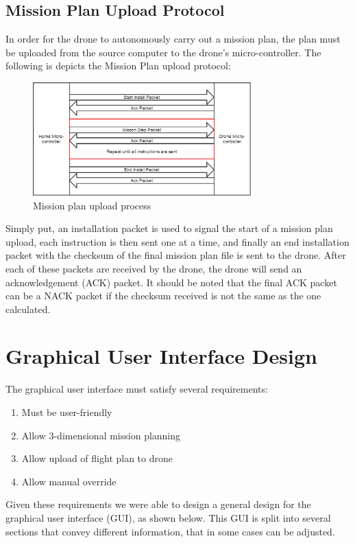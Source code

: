 \documentclass[12pt,a4paper]{article}
\begin{document}
	\subsection{Mission Plan Upload Protocol}
	In order for the drone to autonomously carry out a mission plan, the plan must be uploaded from the source computer to the drone's micro-controller. The following is depicts the Mission Plan upload protocol:
	

	\begin{figure}[h!]

  		\centering
    	\includegraphics[width=0.75\textwidth]{InstallProcessIdea1.png}
   		\caption{Mission plan upload process}
	\end{figure}
	
	Simply put, an installation packet is used to signal the start of a mission plan upload, each instruction is then sent one at a time, and finally an end installation packet with the checksum of the final mission plan file is sent to the drone. After each of these packets are received by the drone, the drone will send an acknowledgement (ACK) packet. It should be noted that the final ACK packet can be a NACK packet if the checksum received is not the same as the one calculated.

\section{Graphical User Interface Design}
The graphical user interface must satisfy several requirements:
\begin{enumerate}
	\item Must be user-friendly
	\item Allow 3-dimensional mission planning
	\item Allow upload of flight plan to drone
	\item Allow manual override
\end{enumerate}

Given these requirements we were able to design a general design for the graphical user interface (GUI), as shown below. This GUI is split into several sections that convey different information, that in some cases can be adjusted. 
\end{document}
